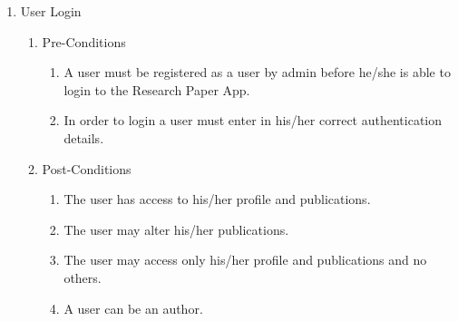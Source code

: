 \documentclass[hidelinks,a4paper,12pt]{article}
\begin{document}
	\begin{enumerate}
		\item  User Login
		
		\begin{enumerate}
			\item  Pre-Conditions
			
			\begin{enumerate}
				\item  A user must be registered as a user by admin before he/she is able to login to the Research Paper App.
				
				\item  In order to login a user must enter in his/her correct authentication details.
			\end{enumerate}
			
			\item  Post-Conditions
			
			\begin{enumerate}
				\item  The user has access to his/her profile and publications.
				
				\item  The user may alter his/her publications.
				
				\item  The user may access only his/her profile and publications and no others.
				
				\item  A user can be an author.
			\end{enumerate}
		\end{enumerate}
	\end{enumerate}
	
	\noindent 
	
\end{document}
